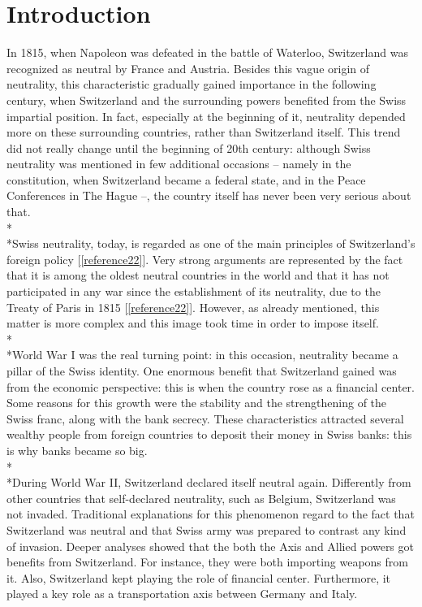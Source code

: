 \documentclass[a4paper]{article}
\begin{document}
\clearpage

\tableofcontents

\clearpage

\section{Introduction}
\label{sec:introduction}
In 1815, when Napoleon was defeated in the battle of Waterloo, Switzerland was recognized as neutral by France and Austria. Besides this vague origin of neutrality, this characteristic gradually gained importance in the following century, when Switzerland and the surrounding powers benefited from the Swiss impartial position. In fact, especially at the beginning of it, neutrality depended more on these surrounding countries, rather than Switzerland itself. This trend did not really change until the beginning of 20th century: although Swiss neutrality was mentioned in few additional occasions – namely in the constitution, when Switzerland became a federal state, and in the Peace Conferences in The Hague –, the country itself has never been very serious about that.
\\*\\*Swiss neutrality, today, is regarded as one of the main principles of Switzerland's foreign policy [\ref{reference22}]. Very strong arguments are represented by the fact that it is among the oldest neutral countries in the world and that it has not participated in any war since the establishment of its neutrality, due to the Treaty of Paris in 1815 [\ref{reference22}]. However, as already mentioned, this matter is more complex and this image took time in order to impose itself.
\\*\\*World War I was the real turning point: in this occasion, neutrality became a pillar of the Swiss identity. One enormous benefit that Switzerland gained was from the economic perspective: this is when the country rose as a financial center. Some reasons for this growth were the stability and the strengthening of the Swiss franc, along with the bank secrecy. These characteristics attracted several wealthy people from foreign countries to deposit their money in Swiss banks: this is why banks became so big.
\\*\\*During World War II, Switzerland declared itself neutral again. Differently from other countries that self-declared neutrality, such as Belgium, Switzerland was not invaded. Traditional explanations for this phenomenon regard to the fact that Switzerland was neutral and that Swiss army was prepared to contrast any kind of invasion. Deeper analyses showed that the both the Axis and Allied powers got benefits from Switzerland. For instance, they were both importing weapons from it. Also, Switzerland kept playing the role of financial center. Furthermore, it played a key role as a transportation axis between Germany and Italy.
\end{document}
